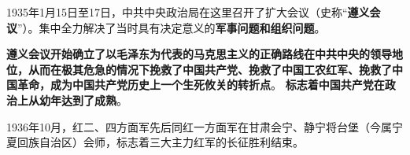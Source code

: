 {1935}年{1}月{15}日至{17}日，中共中央政治局在这里召开了扩大会议（史称{``}\textbf{遵义会议}{''}）。集中全力解决了当时具有决定意义的\textbf{军事问题和组织问题}。{}

\textbf{遵义会议开始确立了以毛泽东为代表的马克思主义的正确路线在中共中央的领导地位，从而在极其危急的情况下挽救了中国共产党、挽救了中国工农红军、挽救了中国革命，成为中国共产党历史上一个生死攸关的转折点}。
\textbf{标志着中国共产党在政治上从幼年达到了成熟}。

{1936年10月，红二、四方面军先后同红一方面军在甘肃会宁、静宁将台堡（今属宁夏回族自治区）会师，}标志着三大主力红军的长征胜利结束{。}
